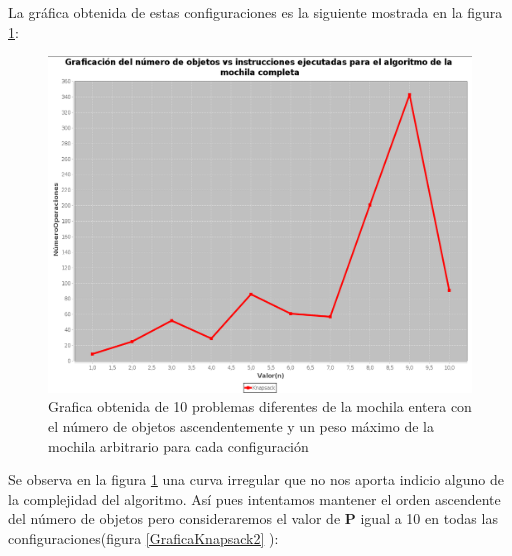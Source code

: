         La gráfica obtenida de estas configuraciones es la siguiente mostrada en la figura \ref{GraficaKnapsack1}:
        \begin{figure}[h!]
            \centering
            \includegraphics[width=15cm]{Knapsack/GraficaKnapsack1.png}
            \caption{Grafica obtenida de 10 problemas diferentes de la mochila entera con el número de objetos ascendentemente y un peso máximo de la mochila arbitrario para cada configuración}
            \label{GraficaKnapsack1}
        \end{figure}
        
        Se observa en la figura \ref{GraficaKnapsack1} una curva irregular que no nos aporta indicio alguno de la complejidad del algoritmo. Así pues intentamos mantener el orden ascendente del número de objetos pero consideraremos el valor de \textbf{P} igual a 10 en todas las configuraciones(figura \ref{GraficaKnapsack2} ):
        
